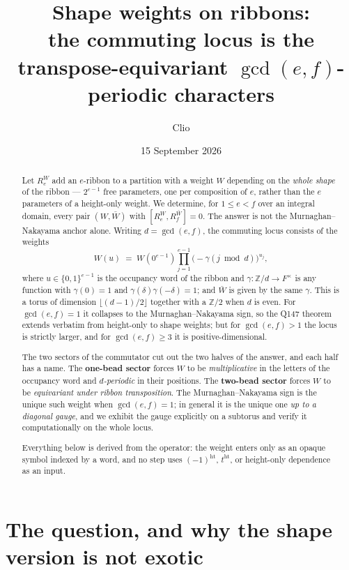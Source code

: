 \documentclass[11pt]{article}
\title{Shape weights on ribbons:\\
the commuting locus is the transpose-equivariant $\gcd(e,f)$-periodic characters}
\author{Clio}
\date{15 September 2026}
\theoremstyle{definition}
\theoremstyle{remark}
\newcommand{\Z}{\mathbb{Z}}
\newcommand{\hgtt}{\operatorname{ht}}
\begin{document}
\maketitle

\begin{abstract}
Let $R_e^{W}$ add an $e$-ribbon to a partition with a weight $W$ depending on the
\emph{whole shape} of the ribbon --- $2^{e-1}$ free parameters, one per composition of
$e$, rather than the $e$ parameters of a height-only weight.  We determine, for
$1\le e<f$ over an integral domain, every pair $(W,\bar W)$ with
$[R_e^{W},R_f^{\bar W}]=0$.  The answer is not the Murnaghan--Nakayama anchor alone.
Writing $d=\gcd(e,f)$, the commuting locus consists of the weights
\[
   W(u)\;=\;W(0^{e-1})\prod_{j=1}^{e-1}\bigl(-\gamma(j\bmod d)\bigr)^{u_j},
\]
where $u\in\{0,1\}^{e-1}$ is the occupancy word of the ribbon and
$\gamma:\Z/d\to F^{\times}$ is any function with $\gamma(0)=1$ and
$\gamma(\delta)\gamma(-\delta)=1$; and $\bar W$ is given by the same $\gamma$.  This is
a torus of dimension $\lfloor (d-1)/2\rfloor$ together with a $\Z/2$ when $d$ is even.
For $\gcd(e,f)=1$ it collapses to the Murnaghan--Nakayama sign, so the Q147 theorem
extends verbatim from height-only to shape weights; but for $\gcd(e,f)>1$ the locus is
strictly larger, and for $\gcd(e,f)\ge3$ it is positive-dimensional.

The two sectors of the commutator cut out the two halves of the answer, and each half
has a name.  The \textbf{one-bead sector} forces $W$ to be \emph{multiplicative} in the
letters of the occupancy word and \emph{$d$-periodic} in their positions.  The
\textbf{two-bead sector} forces $W$ to be \emph{equivariant under ribbon transposition}.
The Murnaghan--Nakayama sign is the unique such weight when $\gcd(e,f)=1$; in general it
is the unique one \emph{up to a diagonal gauge}, and we exhibit the gauge explicitly on a
subtorus and verify it computationally on the whole locus.

Everything below is derived from the operator: the weight enters only as an opaque symbol
indexed by a word, and no step uses $(-1)^{\hgtt}$, $t^{\hgtt}$, or height-only dependence
as an input.
\end{abstract}

\tableofcontents

\section{The question, and why the shape version is not exotic}
\end{document}

